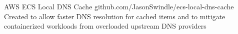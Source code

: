 \projectitem
    {AWS ECS Local DNS Cache}
    {github.com/JasonSwindle/ecs-local-dns-cache}
    {Created to allow faster DNS resolution for cached items and to mitigate containerized workloads from overloaded upstream DNS providers}
